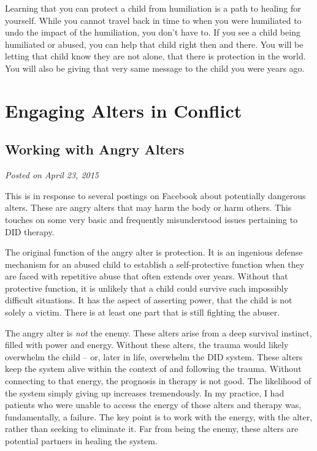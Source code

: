 \documentclass[]{book}
\begin{document}
Learning that you can protect a child from humiliation is a path to healing for yourself. While you cannot travel back in time to when you were humiliated to undo the impact of the humiliation, you don't have to. If you see a child being humiliated or abused, you can help that child right then and there. You will be letting that child know they are not alone, that there is protection in the world. You will also be giving that very same message to the child you were years ago.

\hypertarget{engaging-alters-in-conflict}{%
\chapter{Engaging Alters in Conflict}\label{engaging-alters-in-conflict}}

\hypertarget{working-with-angry-alters}{%
\section{Working with Angry Alters}\label{working-with-angry-alters}}

\emph{Posted on April 23, 2015}

This is in response to several postings on Facebook about potentially dangerous alters. These are angry alters that may harm the body or harm others. This touches on some very basic and frequently misunderstood issues pertaining to DID therapy.

The original function of the angry alter is protection. It is an ingenious defense mechanism for an abused child to establish a self-protective function when they are faced with repetitive abuse that often extends over years. Without that protective function, it is unlikely that a child could survive such impossibly difficult situations. It has the aspect of asserting power, that the child is not solely a victim. There is at least one part that is still fighting the abuser.

The angry alter is \emph{not} the enemy. These alters arise from a deep survival instinct, filled with power and energy. Without these alters, the trauma would likely overwhelm the child -- or, later in life, overwhelm the DID system. These alters keep the system alive within the context of and following the trauma. Without connecting to that energy, the prognosis in therapy is not good. The likelihood of the system simply giving up increases tremendously. In my practice, I had patients who were unable to access the energy of those alters and therapy was, fundamentally, a failure. The key point is to work with the energy, with the alter, rather than seeking to eliminate it. Far from being the enemy, these alters are potential partners in healing the system.
\end{document}
